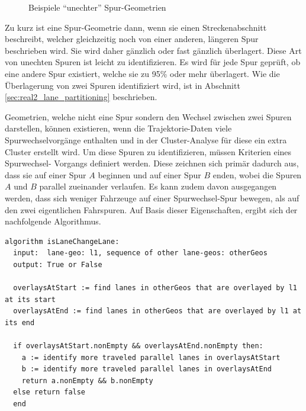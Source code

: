 \begin{figure}[H]
    \centering
    \qquad \qquad
    \caption{Beispiele ``unechter'' Spur-Geometrien}
    \label{fig:real2_results_geometry_definition}
\end{figure}

Zu kurz ist eine Spur-Geometrie dann, wenn sie einen Streckenabschnitt beschreibt, welcher
gleichzeitig noch von einer anderen, längeren Spur beschrieben wird. Sie wird daher
gänzlich oder fast gänzlich überlagert. Diese Art von unechten Spuren ist leicht zu identifizieren.
Es wird für jede Spur geprüft, ob eine andere Spur existiert, welche sie zu 95\% oder mehr überlagert.
Wie die Überlagerung von zwei Spuren identifiziert wird, ist in Abschnitt \ref{sec:real2_lane_partitioning}
beschrieben.

Geometrien, welche nicht eine Spur sondern den Wechsel zwischen zwei Spuren darstellen, können
existieren, wenn die Trajektorie-Daten viele Spurwechselvorgänge enthalten und in der Cluster-Analyse für
diese ein extra Cluster erstellt wird. Um diese Spuren zu identifizieren, müssen Kriterien eines
Spurwechsel- Vorgangs definiert werden. Diese zeichnen sich primär dadurch aus, dass sie auf einer Spur
$A$ beginnen und auf einer Spur $B$ enden, wobei die Spuren $A$ und $B$ parallel zueinander verlaufen.
Es kann zudem davon ausgegangen werden, dass sich weniger Fahrzeuge auf einer Spurwechsel-Spur bewegen,
als auf den zwei eigentlichen Fahrspuren.
Auf Basis dieser Eigenschaften, ergibt sich der nachfolgende Algorithmus.
\begin{lstlisting}[caption=Pseudocode Auswahl gekrümmtr Fahrspur, language=Pseudo, label=lst:pseudo_selectMoreCurvy]
algorithm isLaneChangeLane:
  input:  lane-geo: l1, sequence of other lane-geos: otherGeos
  output: True or False

  overlaysAtStart := find lanes in otherGeos that are overlayed by l1 at its start
  overlaysAtEnd := find lanes in otherGeos that are overlayed by l1 at its end

  if overlaysAtStart.nonEmpty && overlaysAtEnd.nonEmpty then:
    a := identify more traveled parallel lanes in overlaysAtStart
    b := identify more traveled parallel lanes in overlaysAtEnd
    return a.nonEmpty && b.nonEmpty
  else return false
  end
\end{lstlisting}

